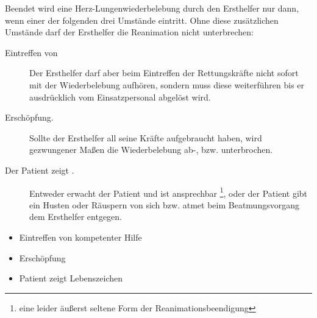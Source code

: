 {
Beendet wird eine Herz-Lungenwiederbelebung durch den Ersthelfer nur
dann, wenn einer der folgenden drei Umstände eintritt. Ohne diese
zusätzlichen Umstände darf der Ersthelfer die Reanimation nicht
unterbrechen: 

\begin{description}
\item[Eintreffen von ] Der Ersthelfer darf aber beim
Eintreffen der Rettungskräfte nicht sofort mit der Wiederbelebung  aufhören, sondern muss diese weiterführen
bis er ausdrücklich vom Einsatzpersonal abgelöst  wird.
\item[Erschöpfung.] Sollte der Ersthelfer all seine Kräfte aufgebraucht haben,
wird gezwungener Maßen die Wiederbelebung ab-, bzw. unterbrochen. 
    \item[Der Patient zeigt .] Entweder 
   erwacht der Patient und ist ansprechbar \footnote{eine
   leider äußerst seltene Form der Reanimationsbeendigung},
   oder der Patient gibt ein Husten oder Räuspern von sich
   bzw. atmet beim Beatmungsvorgang dem Ersthelfer entgegen. 
\end{description}

}{
\begin{itemize}
    \item Eintreffen von kompetenter Hilfe
    \item Erschöpfung
    \item Patient zeigt Lebenszeichen
\end{itemize}
}{}{}{}


 


